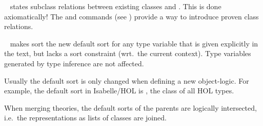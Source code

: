 \begin{isabellebody}
\begin{isamarkuptext}
\begin{description}
  \item \hyperlink{command.classrel}{\mbox{}}~ states subclass
  relations between existing classes  and .
  This is done axiomatically!  The \hyperlink{command.subclass}{\mbox{}} and
  \hyperlink{command.instance}{\mbox{}} commands (see ) provide
  a way to introduce proven class relations.

  \item \hyperlink{command.default-sort}{\mbox{}}~ makes sort  the
  new default sort for any type variable that is given explicitly in
  the text, but lacks a sort constraint (wrt.\ the current context).
  Type variables generated by type inference are not affected.

  Usually the default sort is only changed when defining a new
  object-logic.  For example, the default sort in Isabelle/HOL is
  , the class of all HOL types.

  When merging theories, the default sorts of the parents are
  logically intersected, i.e.\ the representations as lists of classes
  are joined.


\end{description}
\end{isamarkuptext}
\end{isabellebody}
